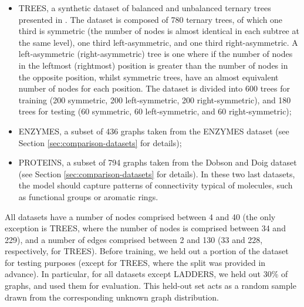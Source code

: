 \begin{itemize}
    \item TREES, a synthetic dataset of balanced and unbalanced ternary trees presented in \citep{bacciu2019baymixhidtreemarkovclus}. The dataset is composed of 780 ternary trees, of which one third is symmetric (\ie the number of nodes is almost identical in each subtree at the same level), one third left-asymmetric, and one third right-asymmetric. A left-asymmetric (right-asymmetric) tree is one where if the number of nodes in the leftmost (rightmost) position is greater than the number of nodes in the opposite position, whilst symmetric trees, have an almost equivalent number of nodes for each position. The dataset is divided into 600 trees for training (200 symmetric, 200 left-symmetric, 200 right-symmetric), and 180 trees for testing (60 symmetric, 60 left-symmetric, and 60 right-symmetric);
    \item ENZYMES, a subset of 436 graphs taken from the ENZYMES dataset \citep{schomburg2004enzymes} (see Section \ref{sec:comparison-datasets} for details);
    \item PROTEINS, a subset of 794 graphs taken from the Dobson and Doig dataset \citep{dobson2003dd} (see Section \ref{sec:comparison-datasets} for details). In these two last datasets, the model should capture patterns of connectivity typical of molecules, such as functional groups or aromatic rings.
\end{itemize}
All datasets have a number of nodes comprised between 4 and 40 (the only exception is TREES, where the number of nodes is comprised between 34 and 229), and a number of edges comprised between 2 and 130 (33 and 228, respectively, for TREES). Before training, we held out a portion of the dataset for testing purposes (except for TREES, where the split was provided in advance). In particular, for all datasets except LADDERS, we held out 30\% of graphs, and used them for evaluation. This held-out set acts as a random sample drawn from the corresponding unknown graph distribution.
